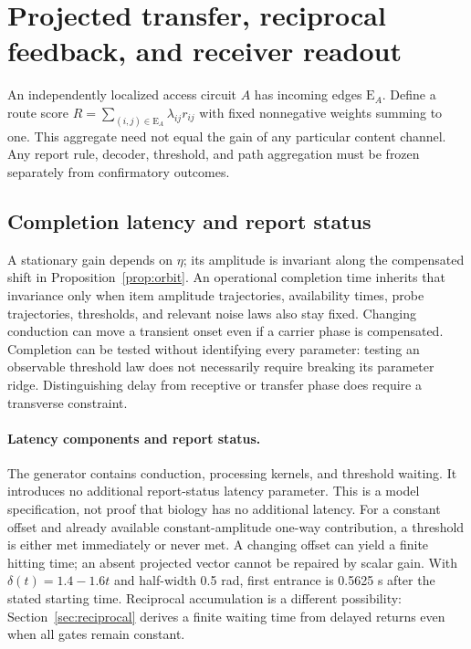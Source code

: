 \documentclass[submission,nolinenumbers]{esj}
\newcommand{\EA}{\mathrm{E}_A}
\begin{document}
\section{Projected transfer, reciprocal feedback, and receiver readout}\label{sec:access}
An independently localized access circuit $A$ has incoming edges $\EA$. Define a route score $R=\sum_{(i,j)\in\EA}\lambda_{ij}r_{ij}$ with fixed nonnegative weights summing to one. This aggregate need not equal the gain of any particular content channel. Any report rule, decoder, threshold, and path aggregation must be frozen separately from confirmatory outcomes.

\subsection{Completion latency and report status}\label{sec:ridgeconstrains}
A stationary gain depends on $\eta$; its amplitude is invariant along the compensated shift in Proposition~\ref{prop:orbit}. An operational completion time inherits that invariance only when item amplitude trajectories, availability times, probe trajectories, thresholds, and relevant noise laws also stay fixed. Changing conduction can move a transient onset even if a carrier phase is compensated. Completion can be tested without identifying every parameter: testing an observable threshold law does not necessarily require breaking its parameter ridge. Distinguishing delay from receptive or transfer phase does require a transverse constraint.

\paragraph{Latency components and report status.}\label{sec:unreported-delay}
The generator contains conduction, processing kernels, and threshold waiting. It introduces no additional report-status latency parameter. This is a model specification, not proof that biology has no additional latency. For a constant offset and already available constant-amplitude one-way contribution, a threshold is either met immediately or never met. A changing offset can yield a finite hitting time; an absent projected vector cannot be repaired by scalar gain. With $\delta(t)=1.4-1.6t$ and half-width 0.5 rad, first entrance is 0.5625 s after the stated starting time. Reciprocal accumulation is a different possibility: Section~\ref{sec:reciprocal} derives a finite waiting time from delayed returns even when all gates remain constant.
\end{document}
